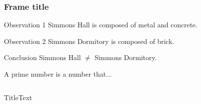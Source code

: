 \documentclass[pdf]{beamer}
\begin{document}
	\begin{frame}
	\frametitle{Frame title}

	\begin{block}{Observation 1}
	Simmons Hall is composed of metal and concrete.
	\end{block}

	\begin{exampleblock}{Observation 2}
	Simmons Dormitory is composed of brick.
	\end{exampleblock}

	\begin{alertblock}{Conclusion}
	Simmons Hall $\not=$ Simmons Dormitory.
	\end{alertblock}

	\begin{definition}
	A prime number is a number that...
	\end{definition}


\begin{columns}
\column{7em}
\begin{block}{Title}Text
\end{block}
\end{columns}





	\end{frame}
\end{document}
